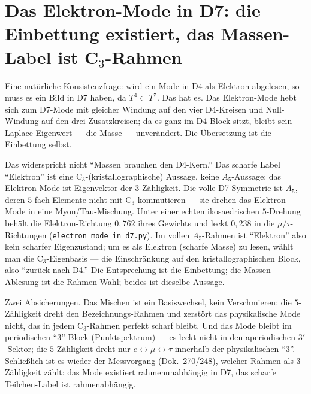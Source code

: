 \section{Das Elektron-Mode in D7: die Einbettung existiert, das Massen-Label ist C$_3$-Rahmen}
Eine nat\"urliche Konsistenzfrage: wird ein Mode in D4 als Elektron abgelesen, so muss es ein
Bild in D7 haben, da $T^4\subset T^7$. Das hat es. Das Elektron-Mode hebt sich zum D7-Mode mit
gleicher Windung auf den vier D4-Kreisen und Null-Windung auf den drei Zusatzkreisen; da es ganz
im D4-Block sitzt, bleibt sein Laplace-Eigenwert --- die Masse --- unver\"andert. Die
\"Ubersetzung ist die Einbettung selbst.

Das widerspricht nicht \enquote{Massen brauchen den D4-Kern.} Das scharfe Label
\enquote{Elektron} ist eine C$_3$-(kristallographische) Aussage, keine $A_5$-Aussage: das
Elektron-Mode ist Eigenvektor der $3$-Z\"ahligkeit. Die volle D7-Symmetrie ist $A_5$, deren
$5$-fach-Elemente nicht mit C$_3$ kommutieren --- sie drehen das Elektron-Mode in eine
Myon/Tau-Mischung. Unter einer echten ikosaedrischen $5$-Drehung beh\"alt die Elektron-Richtung
$0{,}762$ ihres Gewichts und leckt $0{,}238$ in die $\mu/\tau$-Richtungen
(\texttt{electron\_mode\_in\_d7.py}). Im vollen $A_5$-Rahmen ist \enquote{Elektron} also kein
scharfer Eigenzustand; um es als Elektron (scharfe Masse) zu lesen, w\"ahlt man die
C$_3$-Eigenbasis --- die Einschr\"ankung auf den kristallographischen Block, also
\enquote{zur\"uck nach D4.} Die Entsprechung ist die Einbettung; die Massen-Ablesung ist die
Rahmen-Wahl; beides ist dieselbe Aussage.

Zwei Absicherungen. Das Mischen ist ein Basiswechsel, kein Verschmieren: die $5$-Z\"ahligkeit
dreht den Bezeichnungs-Rahmen und zerst\"ort das physikalische Mode nicht, das in jedem
C$_3$-Rahmen perfekt scharf bleibt. Und das Mode bleibt im periodischen \enquote{$3$}-Block
(Punktspektrum) --- es leckt nicht in den aperiodischen $3'$-Sektor; die $5$-Z\"ahligkeit dreht
nur $e\leftrightarrow\mu\leftrightarrow\tau$ innerhalb der physikalischen \enquote{$3$}.
Schlie\ss lich ist es wieder der Messvorgang (Dok.~270/248), welcher Rahmen als $3$-Z\"ahligkeit
z\"ahlt: das Mode existiert rahmenunabh\"angig in D7, das scharfe Teilchen-Label ist
rahmenabh\"angig.

